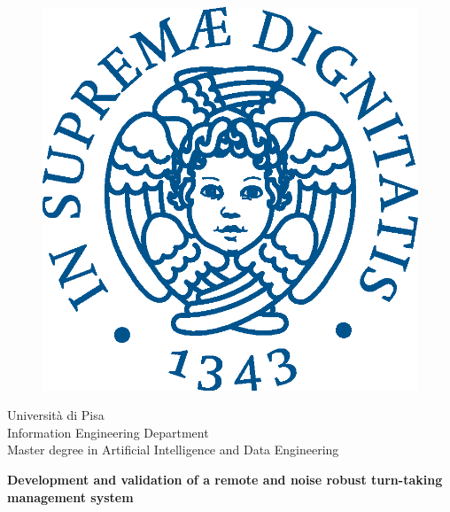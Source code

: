 \documentclass[../main.tex]{subfiles}
\begin{document}
\begin{titlepage}
    \begin{figure}[ht]
        \centering
        \includegraphics[keepaspectratio=true,scale=0.4]{images/cherubinFrontespizio.eps}
    \end{figure}
    
    \begin{center}
        \doublespacing
        \LARGE{Università di Pisa}\\
        \large{Information Engineering Department}\\
        \large{Master degree in Artificial Intelligence and Data Engineering}\\  
    \end{center}

    \vspace{15mm}

    \begin{center}
        \large{\textbf{Development and validation of a remote and noise robust turn-taking management system}}\\
    \end{center}
    

\end{titlepage}
\end{document}
